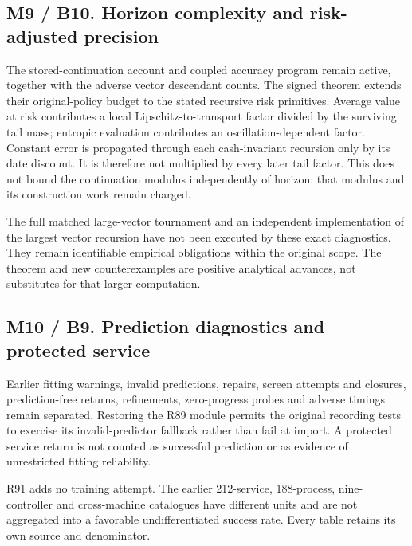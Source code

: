\hypertarget{m9-b10.-horizon-complexity-and-risk-adjusted-precision}{%
\subsection{M9 / B10. Horizon complexity and risk-adjusted
precision}\label{m9-b10.-horizon-complexity-and-risk-adjusted-precision}}

The stored-continuation account and coupled accuracy program remain
active, together with the adverse vector descendant counts. The signed
theorem extends their original-policy budget to the stated recursive
risk primitives. Average value at risk contributes a local
Lipschitz-to-transport factor divided by the surviving tail mass;
entropic evaluation contributes an oscillation-dependent factor.
Constant error is propagated through each cash-invariant recursion only
by its date discount. It is therefore not multiplied by every later tail
factor. This does not bound the continuation modulus independently of
horizon: that modulus and its construction work remain charged.

The full matched large-vector tournament and an independent
implementation of the largest vector recursion have not been executed by
these exact diagnostics. They remain identifiable empirical obligations
within the original scope. The theorem and new counterexamples are
positive analytical advances, not substitutes for that larger
computation.

\hypertarget{m10-b9.-prediction-diagnostics-and-protected-service}{%
\subsection{M10 / B9. Prediction diagnostics and protected
service}\label{m10-b9.-prediction-diagnostics-and-protected-service}}

Earlier fitting warnings, invalid predictions, repairs, screen attempts
and closures, prediction-free returns, refinements, zero-progress probes
and adverse timings remain separated. Restoring the R89 module permits
the original recording tests to exercise its invalid-predictor fallback
rather than fail at import. A protected service return is not counted as
successful prediction or as evidence of unrestricted fitting
reliability.

R91 adds no training attempt. The earlier 212-service, 188-process,
nine-controller and cross-machine catalogues have different units and
are not aggregated into a favorable undifferentiated success rate. Every
table retains its own source and denominator.

